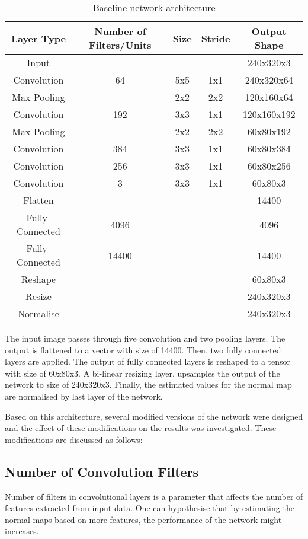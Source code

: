 \begin{table}[h]
\centering
\begin{tabular}{ccccc}
Layer Type & Number of Filters/Units & Size & Stride & Output Shape \\
\hline
Input &  &  &  & 240x320x3 \\
Convolution & 64 & 5x5 & 1x1 & 240x320x64 \\
Max Pooling &  & 2x2 & 2x2 & 120x160x64 \\
Convolution & 192 & 3x3 & 1x1 & 120x160x192 \\
Max Pooling &  & 2x2 & 2x2 & 60x80x192 \\
Convolution & 384 & 3x3 & 1x1 & 60x80x384 \\
Convolution & 256 & 3x3 & 1x1 & 60x80x256 \\
Convolution & 3 & 3x3 & 1x1 & 60x80x3 \\
Flatten &  &  &  & 14400 \\
Fully-Connected & 4096 &  &  & 4096 \\
Fully-Connected & 14400 &  &  & 14400 \\
Reshape &  &  &  & 60x80x3 \\
Resize &  &  &  &  240x320x3 \\
Normalise &  &  &  &  240x320x3 \\
\end{tabular}
\caption{Baseline network architecture}
\label{tab:baseline}
\end{table}

The input image passes through five convolution and two pooling layers. The output is flattened to a vector with size of 14400. Then, two fully connected layers are applied. The output of fully connected layers is reshaped to a tensor with size of 60x80x3. A bi-linear resizing layer, upsamples the output of the network to size of 240x320x3. Finally, the estimated values for the normal map are normalised by last layer of the network. 

Based on this architecture, several modified versions of the network were designed and the effect of these modifications on the results was investigated. These modifications are discussed as follows:

\subsection{Number of Convolution Filters}

Number of filters in convolutional layers is a parameter that affects the number of features extracted from input data. One can hypothesise that by estimating the normal maps based on more features, the performance of the network might increases. 

